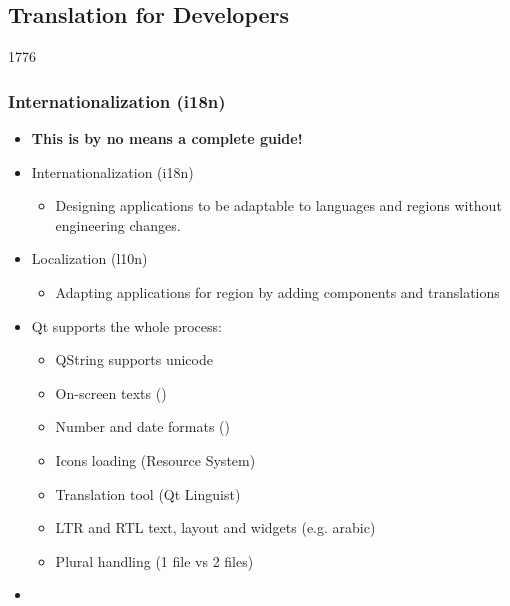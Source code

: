 %
%
%
%

\subsection{Translation for Developers}

\begin{slide}[fragile]{1776} \frametitle{Internationalization (i18n) }
\begin{itemize}
\item \textbf{This is by no means a complete guide!}
\item Internationalization  (i18n)
  \begin{itemize}
  \item Designing applications to be adaptable to languages
  and regions without engineering changes.
  \end{itemize}
\item Localization (l10n)
  \begin{itemize}
  \item Adapting applications for region by adding components and translations
  \end{itemize}

\item Qt supports the whole process:
  \begin{itemize}
  \item QString supports unicode
  \item On-screen texts ()
  \item Number and date formats ()
  \item Icons loading (Resource System)
  \item Translation tool (Qt Linguist)
  \item LTR and RTL text, layout and widgets (e.g. arabic)
  \item Plural handling (1 file vs 2 files)
  \end{itemize}
\end{itemize}
\begin{itemize}
\item {}
\end{itemize}

\end{slide}

